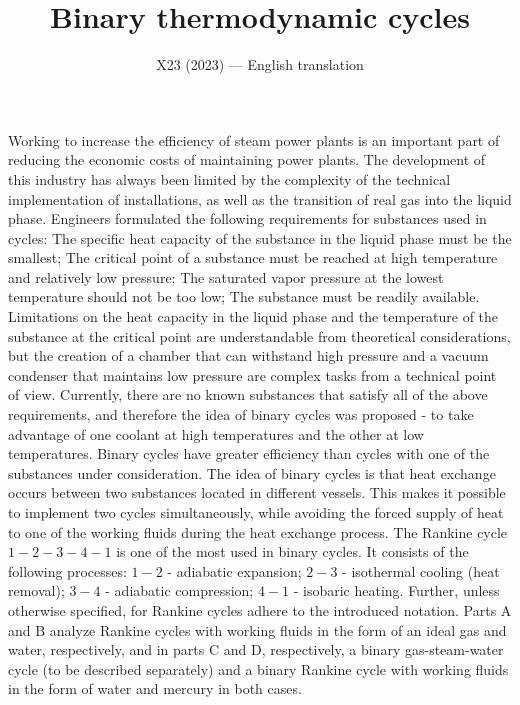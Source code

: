 \documentclass[11pt,a4paper]{article}
\title{\textbf{Binary thermodynamic cycles}}
\author{\normalsize X23 (2023) --- English translation}
\date{}
\begin{document}
\maketitle

Working to increase the efficiency of steam power plants is an important part of reducing the economic costs of maintaining power plants. The development of this industry has always been limited by the complexity of the technical implementation of installations, as well as the transition of real gas into the liquid phase. Engineers formulated the following requirements for substances used in cycles: The specific heat capacity of the substance in the liquid phase must be the smallest; The critical point of a substance must be reached at high temperature and relatively low pressure; The saturated vapor pressure at the lowest temperature should not be too low; The substance must be readily available. Limitations on the heat capacity in the liquid phase and the temperature of the substance at the critical point are understandable from theoretical considerations, but the creation of a chamber that can withstand high pressure and a vacuum condenser that maintains low pressure are complex tasks from a technical point of view. Currently, there are no known substances that satisfy all of the above requirements, and therefore the idea of binary cycles was proposed - to take advantage of one coolant at high temperatures and the other at low temperatures. Binary cycles have greater efficiency than cycles with one of the substances under consideration. The idea of binary cycles is that heat exchange occurs between two substances located in different vessels. This makes it possible to implement two cycles simultaneously, while avoiding the forced supply of heat to one of the working fluids during the heat exchange process. The Rankine cycle $1-2-3-4-1$ is one of the most used in binary cycles. It consists of the following processes: $1-2$ - adiabatic expansion; $2-3$ - isothermal cooling (heat removal); $3-4$ - adiabatic compression; $4-1$ - isobaric heating. Further, unless otherwise specified, for Rankine cycles adhere to the introduced notation. Parts $\mathrm{A}$ and $\mathrm{B}$ analyze Rankine cycles with working fluids in the form of an ideal gas and water, respectively, and in parts $\mathrm{C}$ and $\mathrm{D}$, respectively, a binary gas-steam-water cycle (to be described separately) and a binary Rankine cycle with working fluids in the form of water and mercury in both cases.
\end{document}

